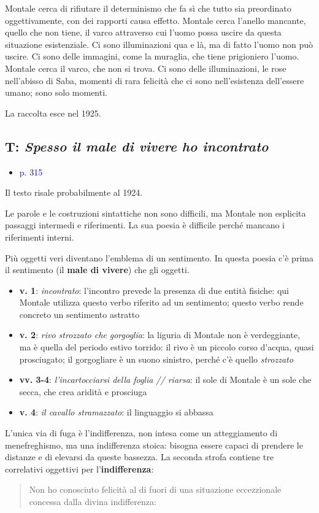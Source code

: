 \documentclass[a4paper, twoside, titlepage]{book}
\newcommand{\elenco}[1]{%
\begin{itemize}
#1
\end{itemize}}
\newcommand{\citazione}[1]{%
  \begin{quotation}
  \begin{linenumbers}
  \modulolinenumbers[5]
  \begingroup
  \setlength{\parindent}{0cm}
  \noindent #1
  \endgroup
  \end{linenumbers}
  \end{quotation}\setcounter{linenumber}{1}
  }
\renewcommand{\emph}[1]{\textcolor{blue}{#1}}
\begin{document}
Montale cerca di rifiutare il determinismo che fa sì che tutto sia preordinato oggettivamente, con dei rapporti causa effetto. Montale cerca l'anello mancante, quello che non tiene, il varco attraverso cui l'uomo possa uscire da questa situazione esistenziale. Ci sono illuminazioni qua e là, ma di fatto l'uomo non può uscire.
Ci sono delle immagini, come la muraglia, che tiene prigioniero l'uomo. Montale cerca il varco, che non si trova. Ci sono delle illuminazioni, le rose nell'abisso di Saba, momenti di rara felicità che ci sono nell'esistenza dell'essere umano; sono solo momenti.

La raccolta esce nel 1925.

\subsection{T: \textit{Spesso il male di vivere ho incontrato}}

\elenco{\item \emph{p. 315}}

Il testo risale probabilmente al 1924.

Le parole e le costruzioni sintattiche non sono difficili, ma Montale non esplicita passaggi intermedi e riferimenti. La sua poesia è difficile perché mancano i riferimenti interni.

Più oggetti veri diventano l'emblema di un sentimento. In questa poesia c'è prima il sentimento (il \textbf{male di vivere}) che gli oggetti.
\elenco{\item \textbf{v. 1}: \textit{incontrato}: l'incontro prevede la presenza di due entità fisiche: qui Montale utilizza questo verbo riferito ad un sentimento; questo verbo rende concreto un sentimento astratto\item \textbf{v. 2}: \textit{rivo strozzato che gorgoglia}: la liguria di Montale non è verdeggiante, ma è quella del periodo estivo torrido: il rivo è un piccolo corso d'acqua, quasi prosciugato; il gorgogliare è un suono sinistro, perché c'è quello \textit{strozzato}\item \textbf{vv. 3-4}: \textit{l'incartocciarsi della foglia // riarsa}: il sole di Montale è un sole che secca, che crea aridità e prosciuga\item \textbf{v. 4}: \textit{il cavallo stramazzato}: il linguaggio si abbassa}

L'unica via di fuga è l'indifferenza, non intesa come un atteggiamento di menefreghismo, ma una indifferenza stoica: bisogna essere capaci di prendere le distanze e di elevarsi da queste bassezza.
La seconda strofa contiene tre correlativi oggettivi per l'\textbf{indifferenza}:
\citazione{ Non ho conosciuto felicità al di fuori di una situazione eccezzionale concessa dalla divina indifferenza:}
\end{document}
